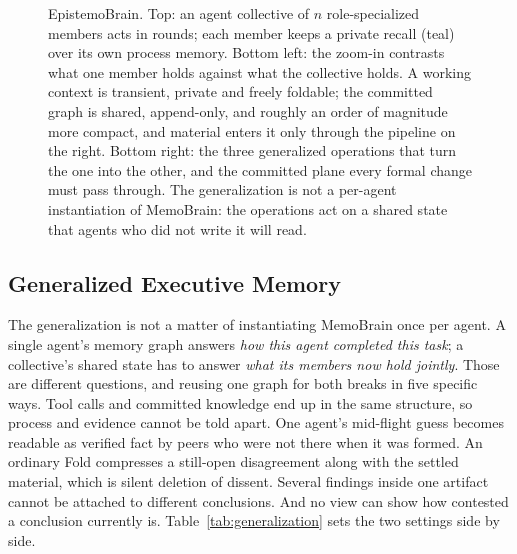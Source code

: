 \begin{figure}[t]
{}
\caption{EpistemoBrain. Top: an agent collective of $n$ role-specialized
members acts in rounds; each member keeps a private recall (teal) over its own
process memory. Bottom left: the zoom-in contrasts what one member holds
against what the collective holds. A working context is transient, private and
freely foldable; the committed graph is shared, append-only, and roughly an
order of magnitude more compact, and material enters it only through the
pipeline on the right. Bottom right: the three generalized operations that turn
the one into the other, and the committed plane every formal change must pass
through. The generalization is not a per-agent instantiation of MemoBrain: the
operations act on a shared state that agents who did not write it will read.}
\label{fig:overview}
\end{figure}

\subsection{Generalized Executive Memory}
\label{sec:memory}

The generalization is not a matter of instantiating MemoBrain once per agent.
A single agent's memory graph answers \emph{how this agent completed this
task}; a collective's shared state has to answer \emph{what its members now
hold jointly}. Those are different questions, and reusing one graph for both
breaks in five specific ways. Tool calls and committed knowledge end up in the
same structure, so process and evidence cannot be told apart. One agent's
mid-flight guess becomes readable as verified fact by peers who were not there
when it was formed. An ordinary Fold compresses a still-open disagreement along
with the settled material, which is silent deletion of dissent. Several
findings inside one artifact cannot be attached to different conclusions. And
no view can show how contested a conclusion currently is.
Table~\ref{tab:generalization} sets the two settings side by side.

